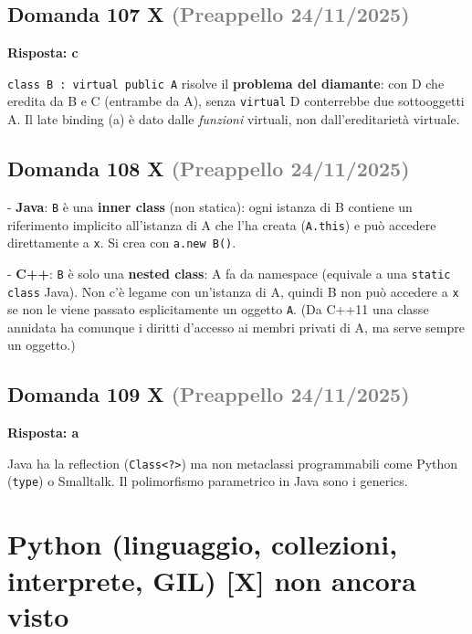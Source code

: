 \documentclass[a4paper,11pt]{article}
\begin{document}
\subsection*{Domanda 107 X \hfill {\small \textcolor{gray}{(Preappello 24/11/2025)}}}
\textbf{Risposta: c}\par
\texttt{class B : virtual public A} risolve il \textbf{problema del diamante}: con D che eredita da B e C (entrambe da A), senza \texttt{virtual} D conterrebbe due sottooggetti A. Il late binding (a) è dato dalle \textit{funzioni} virtuali, non dall'ereditarietà virtuale.



\subsection*{Domanda 108 X \hfill {\small \textcolor{gray}{(Preappello 24/11/2025)}}}
- \textbf{Java}: \texttt{B} è una \textbf{inner class} (non statica): ogni istanza di B contiene un riferimento implicito all'istanza di A che l'ha creata (\texttt{A.this}) e può accedere direttamente a \texttt{x}. Si crea con \texttt{a.new B()}.

- \textbf{C++}: \texttt{B} è solo una \textbf{nested class}: A fa da namespace (equivale a una \texttt{static class} Java). Non c'è legame con un'istanza di A, quindi B non può accedere a \texttt{x} se non le viene passato esplicitamente un oggetto \texttt{A}. (Da C++11 una classe annidata ha comunque i diritti d'accesso ai membri privati di A, ma serve sempre un oggetto.)



\subsection*{Domanda 109 X \hfill {\small \textcolor{gray}{(Preappello 24/11/2025)}}}
\textbf{Risposta: a}\par
Java ha la reflection (\texttt{Class\textless{}?\textgreater{}}) ma non metaclassi programmabili come Python (\texttt{type}) o Smalltalk. Il polimorfismo parametrico in Java sono i generics.



\section{Python (linguaggio, collezioni, interprete, GIL) [X] non ancora visto}
\end{document}
